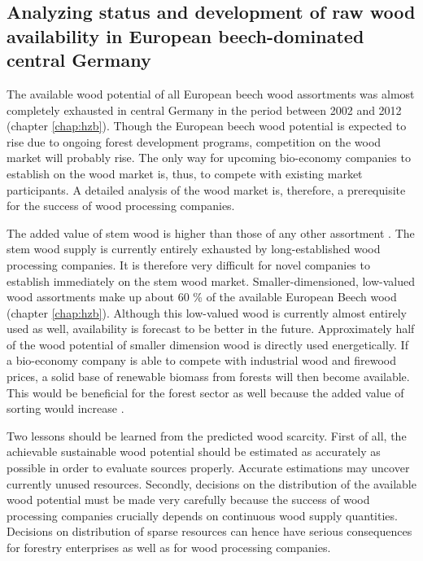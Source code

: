 \subsection{Analyzing status and development of raw wood availability in European beech-dominated central Germany}
\label{subsec:discussion:struct:hzb}
The available wood potential of all European beech wood assortments was almost completely exhausted in central Germany in the period between 2002 and 2012 (chapter \ref{chap:hzb}). Though the European beech wood potential is expected to rise due to ongoing forest development programs, competition on the wood market will probably rise. The only way for upcoming bio-economy companies to establish on the wood market is, thus, to compete with existing market participants. A detailed analysis of the wood market is, therefore, a prerequisite for the success of wood processing companies.

The added value of stem wood is higher than those of any other assortment \citep{nagel_2008}. The stem wood supply is currently entirely exhausted by long-established wood processing companies. It is therefore very difficult for novel companies to establish immediately on the stem wood market. Smaller-dimensioned, low-valued wood assortments make up about 60 \% of the available European Beech wood (chapter \ref{chap:hzb}). Although this low-valued wood is currently almost entirely used as well, availability is forecast to be better in the future. Approximately half of the wood potential of smaller dimension wood is directly used energetically. If a bio-economy company is able to compete with industrial wood and firewood prices, a solid base of renewable biomass from forests will then become available. This would be beneficial for the forest sector as well because the added value of sorting would increase \cite[p. 67]{mohring_1997}.

Two lessons should be learned from the predicted wood scarcity. First of all, the achievable sustainable wood potential should be estimated as accurately as possible in order to evaluate sources properly. Accurate estimations may uncover currently unused resources. Secondly, decisions on the distribution of the available wood potential must be made very carefully because the success of wood processing companies crucially depends on continuous wood supply quantities. Decisions on distribution of sparse resources can hence have serious consequences for forestry enterprises as well as for wood processing companies.

